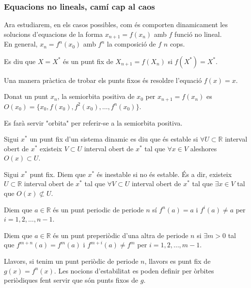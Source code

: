\documentclass[../main.tex]{subfiles}
\begin{document}
\subsubsection{Equacions no lineals, camí cap al caos}
Ara estudiarem, en els casos possibles, com és comporten dinamicament les solucions d'equacions de la forma $x_{n+1} = f(x_n)$ amb $f$ funció no lineal.\\
En general, $x_n = f^n(x_0)$ amb $f^n$ la composició de $f$ $n$ cops.\\
\begin{definicio}
    Es diu que $X = X^*$ és un punt fix de $X_{n+1} = f(X_n)$ si $f(X^*) = X^*$.
\end{definicio}
Una manera pràctica de trobar els punts fixos és resoldre l'equació $f(x) = x$.
\begin{definicio}
    Donat un punt $x_n$, la semiorbita positiva de $x_0$ per $x_{n+1} = f(x_n)$ es $O(x_0) = \{x_0, f(x_0), f^2(x_0), \dots, f^n(x_0)\}$.
\end{definicio}
\begin{notacio}
    Es farà servir "orbita" per referir-se a la semiorbita positiva.
\end{notacio}
\begin{definicio}
    Sigui $x^*$ un punt fix d'un sistema dinamic es diu que és estable si $\forall U \subset \mathbb{R}$ interval obert de $x^*$ existeix $V \subset U$ interval obert de $x^*$ tal que $\forall x \in V$ aleshores $O(x) \subset U$.
\end{definicio}
\begin{definicio}
    Sigui $x^*$ punt fix. Diem que $x^*$ és inestable si no és estable. És a dir, existeix $U \subset \mathbb{R}$ interval obert de $x^*$ tal que $\forall V \subset U$ interval obert de $x^*$ tal que $\exists x \in V$ tal que $O(x) \not\subset U$.
\end{definicio}
\begin{definicio}
    Diem que $a \in \mathbb{R}$ és un punt periodic de periode $n$ sí $f^n(a) = a$ i $f^i(a) \neq a$ per $i = 1, 2, \dots, n-1$.
\end{definicio}
\begin{definicio}
    Diem que $a \in \mathbb{R}$ és un punt preperiòdic d'una altra de periode $n$ si $\exists m > 0$ tal que $f^{m+n}(a) = f^m(a)$ i $f^{m+i}(a) \neq f^{m}$ per $i = 1, 2, \dots, m-1$.
\end{definicio}
Llavors, si tenim un punt periòdic de periode $n$, llavors es punt fix de $g(x) = f^{n}(x)$. Les nocions d'estabilitat es poden definir per òrbites periòdiques fent servir que són punts fixos de $g$.
\end{document}

